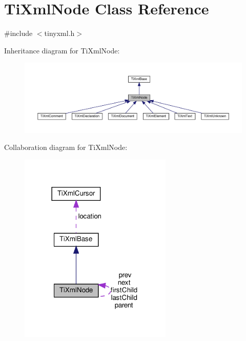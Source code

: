 \hypertarget{classTiXmlNode}{}\section{Ti\+Xml\+Node Class Reference}
\label{classTiXmlNode}


{\ttfamily \#include $<$tinyxml.\+h$>$}



Inheritance diagram for Ti\+Xml\+Node\+:
\nopagebreak
\begin{figure}[H]
\begin{center}
\leavevmode
\includegraphics[width=350pt]{classTiXmlNode__inherit__graph}
\end{center}
\end{figure}


Collaboration diagram for Ti\+Xml\+Node\+:
\nopagebreak
\begin{figure}[H]
\begin{center}
\leavevmode
\includegraphics[width=206pt]{classTiXmlNode__coll__graph}
\end{center}
\end{figure}
